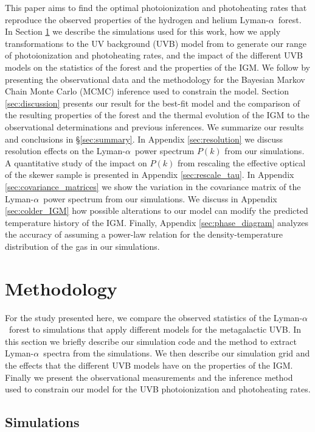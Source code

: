 \documentclass[twocolumn]{aastex62}
\newcommand\Lya{Lyman-$\alpha$}
\begin{document}
This paper aims to find the optimal photoionization and photoheating rates 
that reproduce the observed properties of the hydrogen and helium \Lya\  forest.
In Section \ref{sec:methods} we describe 
the simulations used for this work,
how we apply transformations to the UV background (UVB)
model from \citealt{puchwein2019a} to generate our range of
photoionization and photoheating rates,
and the impact of the different UVB models on the statistics of the forest and the properties of the IGM. We follow by 
presenting the observational data and the methodology for the Bayesian Markov Chain Monte Carlo (MCMC) inference used to constrain the model. Section \ref{sec:discussion}
presents our result for the best-fit model and the comparison of the resulting properties of the forest and the thermal evolution of the IGM to the 
observational determinations and previous inferences. We summarize our results and conclusions in \S \ref{sec:summary}.
In Appendix
\ref{sec:resolution} we discuss resolution effects on the \Lya\ power spectrum $P(k)$ from our simulations.
A quantitative study of the
impact on $P(k)$ from rescaling the effective optical of the skewer sample 
is presented 
in Appendix \ref{sec:rescale_tau}. In Appendix \ref{sec:covariance_matrices} we show the variation in the
covariance matrix of the \Lya\ power spectrum from our simulations.    
We discuss in Appendix \ref{sec:colder_IGM} how possible alterations to our
model can modify the predicted temperature history of the IGM.
Finally,
Appendix \ref{sec:phase_diagram} analyzes
the accuracy of assuming a power-law relation for the density-temperature distribution of the gas in our simulations. 

\section{Methodology} \label{sec:methods}

For the study presented here, we compare the observed statistics of the \Lya\ forest to simulations that apply different models for the metagalactic UVB. 
In this section we briefly describe our simulation code and the method to 
extract \Lya\ spectra from the simulations. We then describe 
our simulation grid and the effects that the different UVB models have on the properties of the IGM. Finally we present the observational measurements 
and the inference method used to constrain our model for the UVB
photoionization and photoheating rates. 

\subsection{Simulations} \label{sec:simulation}
\end{document}
